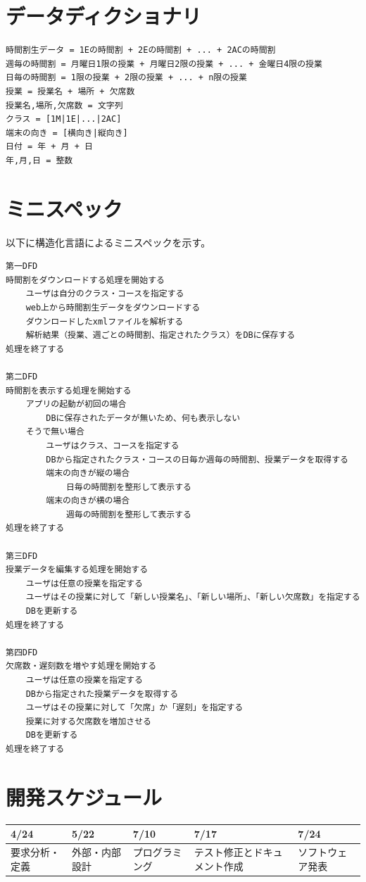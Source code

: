 \documentclass[a4paper,11pt]{jsarticle}
\begin{document}
\section{データディクショナリ}
\begin{verbatim}
時間割生データ = 1Eの時間割 + 2Eの時間割 + ... + 2ACの時間割
週毎の時間割 = 月曜日1限の授業 + 月曜日2限の授業 + ... + 金曜日4限の授業
日毎の時間割 = 1限の授業 + 2限の授業 + ... + n限の授業
授業 = 授業名 + 場所 + 欠席数
授業名,場所,欠席数 = 文字列
クラス = [1M|1E|...|2AC]
端末の向き = [横向き|縦向き]
日付 = 年 + 月 + 日
年,月,日 = 整数
\end{verbatim}

\section{ミニスペック}
以下に構造化言語によるミニスペックを示す。

\begin{verbatim}
第一DFD
時間割をダウンロードする処理を開始する
    ユーザは自分のクラス・コースを指定する
    web上から時間割生データをダウンロードする
    ダウンロードしたxmlファイルを解析する
    解析結果（授業、週ごとの時間割、指定されたクラス）をDBに保存する
処理を終了する

第二DFD
時間割を表示する処理を開始する
    アプリの起動が初回の場合
        DBに保存されたデータが無いため、何も表示しない
    そうで無い場合
        ユーザはクラス、コースを指定する
        DBから指定されたクラス・コースの日毎か週毎の時間割、授業データを取得する
        端末の向きが縦の場合
            日毎の時間割を整形して表示する
        端末の向きが横の場合
            週毎の時間割を整形して表示する
処理を終了する

第三DFD
授業データを編集する処理を開始する
    ユーザは任意の授業を指定する
    ユーザはその授業に対して「新しい授業名」、「新しい場所」、「新しい欠席数」を指定する
    DBを更新する
処理を終了する

第四DFD
欠席数・遅刻数を増やす処理を開始する
    ユーザは任意の授業を指定する
    DBから指定された授業データを取得する
    ユーザはその授業に対して「欠席」か「遅刻」を指定する
    授業に対する欠席数を増加させる
    DBを更新する
処理を終了する
\end{verbatim}

\section{開発スケジュール}

\begin{table}[H]
\begin{tabular}{|l|l|l|l|l|} \hline
4/24 & 5/22 & 7/10 & 7/17 & 7/24 \\ \hline
要求分析・定義 & 外部・内部設計 & プログラミング & テスト修正とドキュメント作成 & ソフトウェア発表 \\ \hline
\end{tabular}
\end{table}
\end{document}
